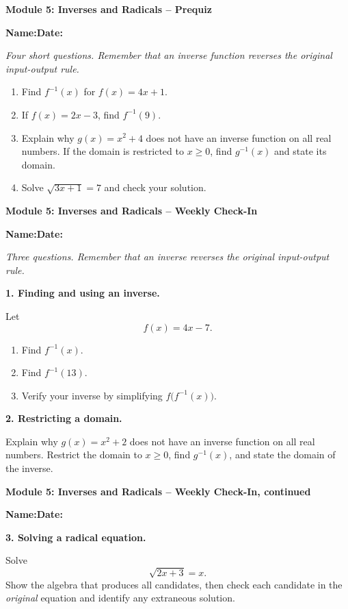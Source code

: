 \documentclass[11pt]{article}
\newcommand{\assessmenttitle}[2]{%
  {\Large\bfseries Module #1: #2}\par\vspace{3pt}
}
\newcommand{\studentline}{%
\noindent\textbf{Name:}\hspace{2.6in}\textbf{Date:}\hspace{1.15in}\par\vspace{7pt}}
\newcommand{\directions}[1]{\textit{#1}\par\vspace{4pt}}
\newcommand{\answerblank}[1]{\vspace{#1}}
\begin{document}
\assessmenttitle{5}{Inverses and Radicals -- Prequiz}
\studentline
\directions{Four short questions. Remember that an inverse function reverses the original input-output rule.}
\begin{enumerate}
\item Find $f^{-1}(x)$ for $f(x)=4x+1$.
\answerblank{0.50in}
\item If $f(x)=2x-3$, find $f^{-1}(9)$.
\answerblank{0.48in}
\item Explain why $g(x)=x^2+4$ does not have an inverse function on all real numbers. If the domain is restricted to $x\ge 0$, find $g^{-1}(x)$ and state its domain.
\answerblank{0.82in}
\item Solve $\sqrt{3x+1}=7$ and check your solution.
\answerblank{0.70in}
\end{enumerate}
\newpage

\assessmenttitle{5}{Inverses and Radicals -- Weekly Check-In}
\studentline
\directions{Three questions. Remember that an inverse reverses the original input-output rule.}
\textbf{1. Finding and using an inverse.}

Let
\[
f(x)=4x-7.
\]
\begin{enumerate}[label=(\alph*),leftmargin=0.35in]
\item Find $f^{-1}(x)$.
\answerblank{0.62in}
\item Find $f^{-1}(13)$.
\answerblank{0.42in}
\item Verify your inverse by simplifying $f\bigl(f^{-1}(x)\bigr)$.
\answerblank{0.68in}
\end{enumerate}

\textbf{2. Restricting a domain.}

Explain why $g(x)=x^2+2$ does not have an inverse function on all real numbers. Restrict the domain to $x\ge0$, find $g^{-1}(x)$, and state the domain of the inverse.
\answerblank{1.55in}
\newpage

\assessmenttitle{5}{Inverses and Radicals -- Weekly Check-In, continued}
\studentline
\textbf{3. Solving a radical equation.}

Solve
\[
\sqrt{2x+3}=x.
\]
Show the algebra that produces all candidates, then check each candidate in the \emph{original} equation and identify any extraneous solution.
\answerblank{4.35in}
\end{document}
